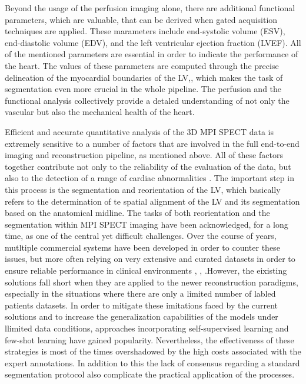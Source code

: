 Beyond the usage of the perfusion imaging alone, there are additional functional parameters, which are valuable, that can be derived when gated acquisition techniques are applied. These marameters include end-systolic volume (ESV), end-diastolic volume (EDV), and the left ventricular ejection fraction (LVEF). All of the mentioned parameters are essential in order to indicate the performance of the heart. The values of these parameters are computed through the precise delineation of the myocardial boundaries of the LV,, which makes the task of segmentation even more crucial in the whole pipeline. The perfusion and the functional analysis collectively provide a detaled understanding of not only the vascular but also the mechanical health of the heart.

Efficient and accurate quantitative analysis of the 3D MPI SPECT data is extremely sensitive to a number of factors that are involved in the full end-to-end imaging and reconstruction pipeline, as mentioned above. All of these factors together contribute not only to the reliability of the evaluation of the data, but also to the detection of a range of cardiac abnormalities \cite{SLOMKA2012338}. The important step in this process is the segmentation and reorientation of the LV, which basically refers to the determination of te spatial alignment of the LV and its segmentation based on the anatomical midline. The tasks of both reorientation and the segmentation within MPI SPECT imaging have been acknowledged, for a long time, as one of the central yet difficult challenges. Over the course of years, mutltiple commercial systems have been developed in order to counter these issues, but more often relying on very extensive and curated datasets in order to ensure reliable performance in clinical environments \cite{Garcia2007}, \cite{Liu2007}, \cite{Ficaro2007}.However, the eixisting solutions fall short when they are applied to the newer reconstruction paradigms, especially in the situations where there are only a limited number of labled patients datasets. In order to mitigate these imitations faced by the current solutions and to increase the generalization capabilities of the models under llimited data conditions, approaches incorporating self-supervised learning and few-shot learning have gained popularity. Nevertheless, the effectiveness of these strategies is most of the times overshadowed by the high costs associated with the expert annotations. In addition to this the lack of consensus regarding a standard segmentation protocol also complicate the practical application of the processes.

